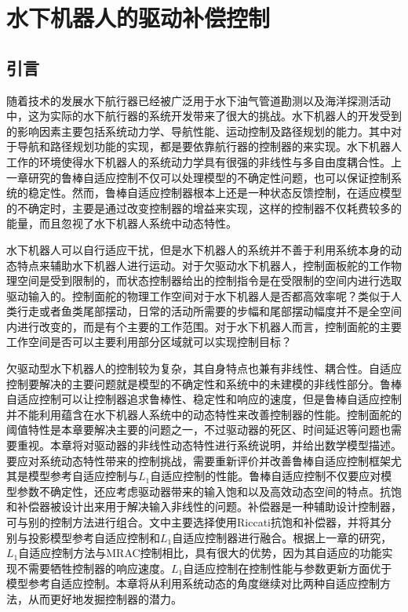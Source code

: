 
\chapter{水下机器人的驱动补偿控制 }

\label{chap:actuator_nonlinearities}
\section{引言 }

随着技术的发展水下航行器已经被广泛用于水下油气管道勘测以及海洋探测活动中，这为实际的水下航行器的系统开发带来了很大的挑战。水下机器人的开发受到的影响因素主要包括系统动力学、导航性能、运动控制及路径规划的能力。其中对于导航和路径规划功能的实现，都是要依靠航行器的控制器的来实现\cite{richter2016polynomial}。水下机器人工作的环境使得水下机器人的系统动力学具有很强的非线性与多自由度耦合性。上一章研究的鲁棒自适应控制不仅可以处理模型的不确定性问题，也可以保证控制系统的稳定性。然而，鲁棒自适应控制器根本上还是一种状态反馈控制，在适应模型的不确定时，主要是通过改变控制器的增益来实现，这样的控制器不仅耗费较多的能量，而且忽视了水下机器人系统中动态特性。

水下机器人可以自行适应干扰，但是水下机器人的系统并不善于利用系统本身的动态特点来辅助水下机器人进行运动。对于欠驱动水下机器人，控制面板舵的工作物理空间是受到限制的，而状态控制器给出的控制指令是在受限制的空间内进行选取驱动输入的。控制面舵的物理工作空间对于水下机器人是否都高效率呢？类似于人类行走或者鱼类尾部摆动，日常的活动所需要的步幅和尾部摆动幅度并不是全空间内进行改变的，而是有个主要的工作范围。对于水下机器人而言，控制面舵的主要工作空间是否可以主要利用部分区域就可以实现控制目标？

欠驱动型水下机器人的控制较为复杂，其自身特点也兼有非线性、耦合性。自适应控制要解决的主要问题就是模型的不确定性和系统中的未建模的非线性部分。鲁棒自适应控制可以让控制器追求鲁棒性、稳定性和响应的速度，但是鲁棒自适应控制并不能利用蕴含在水下机器人系统中的动态特性来改善控制器的性能。控制面舵的阈值特性是本章要解决主要的问题之一，不过驱动器的死区、时间延迟等问题也需要重视。本章将对驱动器的非线性动态特性进行系统说明，并给出数学模型描述。要应对系统动态特性带来的控制挑战，需要重新评价并改善鲁棒自适应控制框架尤其是模型参考自适应控制与$L_1$自适应控制的性能。鲁棒自适应控制不仅要应对模型参数不确定性，还应考虑驱动器带来的输入饱和以及高效动态空间的特点。抗饱和补偿器被设计出来用于解决输入非线性的问题。补偿器是一种辅助设计控制器，可与别的控制方法进行组合。文中主要选择使用Riccati抗饱和补偿器，并将其分别与投影模型参考自适应控制和$L_1$自适应控制器进行融合。根据上一章的研究，$L_1$自适应控制方法与MRAC控制相比，具有很大的优势，因为其自适应的功能实现不需要牺牲控制器的响应速度。$L_1$自适应控制在控制性能与参数更新方面优于模型参考自适应控制。本章将从利用系统动态的角度继续对比两种自适应控制方法，从而更好地发掘控制器的潜力。

